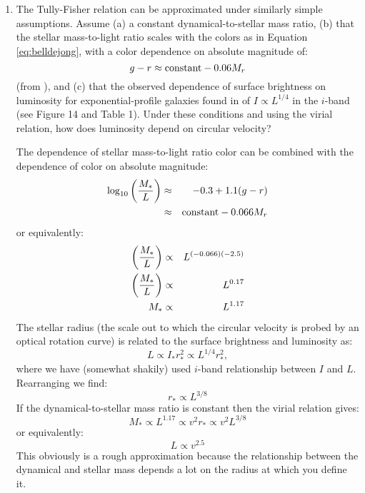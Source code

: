 \begin{enumerate}
\begin{enumerate}
\end{enumerate}
\item The Tully-Fisher relation can be approximated under similarly
simple assumptions. Assume (a) a constant dynamical-to-stellar mass ratio,
(b) that the stellar mass-to-light ratio scales with the colors as in
Equation \ref{eq:belldejong}, with a color dependence on absolute
magnitude of: 
\begin{equation}
g-r \approx {\rm constant} - 0.06 M_r
\end{equation}
(from \citealt{blanton03b}), and (c) that the observed
dependence of surface brightness on luminosity for exponential-profile
galaxies found in \citet{blanton03d} of $I\propto L^{1/4}$ in the
$i$-band (see Figure 14 and Table 1). Under these conditions and using
the virial relation, how does luminosity depend on circular velocity?

\begin{answer}
The \citet{bell00a} dependence of stellar mass-to-light ratio color
can be combined with the dependence of color on absolute magnitude:
\begin{eqnarray}
\log_{10} \left(\frac{M_\ast}{L}\right) &\approx& -0.3 + 1.1 (g-r) \cr
&\approx& \mathrm{constant} - 0.066 M_r  \cr
\end{eqnarray}
or equivalently:
\begin{eqnarray}
\left(\frac{M_\ast}{L}\right) &\propto& L^{(-0.066)(-2.5)} \cr
\left(\frac{M_\ast}{L}\right) &\propto& L^{0.17} \cr
M_\ast &\propto& L^{1.17}
\end{eqnarray}
The stellar radius (the scale out to which the circular velocity is
probed by an optical rotation curve) is related to the surface
brightness and luminosity as:
\begin{equation}
L \propto I_\ast r_\ast^2 \propto L^{1/4} r_\ast^2,
\end{equation}
where we have (somewhat shakily) used $i$-band relationship between
$I$ and $L$.  Rearranging we find:
\begin{equation}
r_\ast \propto L^{3/8}
\end{equation}
If the dynamical-to-stellar mass ratio is constant then the virial
relation gives:
\begin{equation}
M_\ast \propto L^{1.17} \propto v^2 r_\ast \propto v^2 L^{3/8}
\end{equation}
or equivalently:
\begin{equation}
L \propto v^{2.5}
\end{equation}
This obviously is a rough approximation because the relationship
between the dynamical and stellar mass depends a lot on the radius at
which you define it.
\end{answer}
\end{enumerate}

